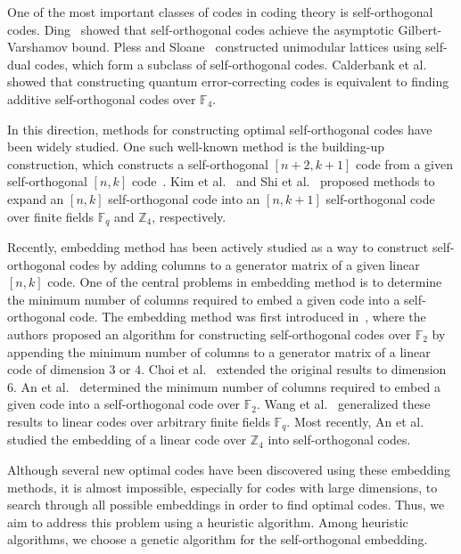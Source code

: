 \documentclass{article}
\begin{document}
One of the most important classes of codes in coding theory is self-orthogonal codes. Ding~\cite{d-2009} showed that self-orthogonal codes achieve the asymptotic Gilbert-Varshamov bound. Pless and Sloane~\cite{ps-1975} constructed unimodular lattices using self-dual codes, which form a subclass of self-orthogonal codes. Calderbank et al.~\cite{crss-1998} showed that constructing quantum error-correcting codes is equivalent to finding additive self-orthogonal codes over $\mathbb{F}_4$.

In this direction, methods for constructing optimal self-orthogonal codes have been widely studied. One such well-known method is the building-up construction, which constructs a self-orthogonal $[n+2,k+1]$ code from a given self-orthogonal $[n,k]$ code~\cite{kl-2004, lk-2015, h-2021, k-2023}. Kim et al.~\cite{kll-2026} and Shi et al.~\cite{st-2026} proposed methods to expand an $[n,k]$ self-orthogonal code into an $[n,k+1]$ self-orthogonal code over finite fields $\mathbb{F}_q$ and $\mathbb{Z}_4$, respectively.

Recently, embedding method has been actively studied as a way to construct self-orthogonal codes by adding columns to a generator matrix of a given linear $[n,k]$ code. One of the central problems in embedding method is to determine the minimum number of columns required to embed a given code into a self-orthogonal code. The embedding method was first introduced in~\cite{kkl-2021}, where the authors proposed an algorithm for constructing self-orthogonal codes over $\mathbb{F}_2$ by appending the minimum number of columns to a generator matrix of a linear code of dimension $3$ or $4$. Choi et al.~\cite{kc-2022} extended the original results to dimension $6$. An et al.~\cite{akklw-2025} determined the minimum number of columns required to embed a given code into a self-orthogonal code over $\mathbb{F}_2$. Wang et al.~\cite{wl-2026} generalized these results to linear codes over arbitrary finite fields $\mathbb{F}_q$. Most recently, An et al.~\cite{akl-2026} studied the embedding of a linear code over $\mathbb{Z}_4$ into self-orthogonal codes.

Although several new optimal codes have been discovered using these embedding methods, it is almost impossible, especially for codes with large dimensions, to search through all possible embeddings in order to find optimal codes. Thus, we aim to address this problem using a heuristic algorithm. Among heuristic algorithms, we choose a genetic algorithm for the self-orthogonal embedding.
\end{document}
